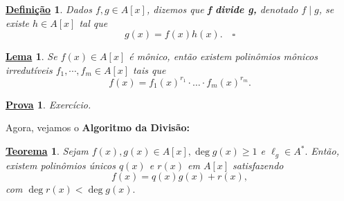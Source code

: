 \documentclass{article}
\newtheorem*{def*}{\underline{Defini\c c\~ao}}
\newtheorem*{theorem*}{\underline{Teorema}}
\newtheorem*{lemma*}{\underline{Lema}}
\newtheorem*{proof*}{\underline{Prova}}
\begin{document}
    \begin{def*}
      Dados \(f, g\in A[x]\), dizemos que \textbf{f divide g,} denotado \(f\mid g\), se existe \(h\in A[x]\) tal que 
      \[
        g(x) = f(x)h(x).\quad\square
      \]
    \end{def*}
    \begin{lemma*}
      Se \(f(x)\in A[x]\) é mônico, então existem polinômios mônicos irredutíveis \(f_{1}, \cdots, f_{m}\in A[x]\) tais que 
      \[
        f(x) = f_{1}(x)^{r_{1}}\cdot \dotsc \cdot f_{m}(x)^{r_{m}}.
      \]
    \end{lemma*}
    \begin{proof*}
      Exercício.
    \end{proof*}
    Agora, vejamos o \textbf{Algoritmo da Divisão:}
    \begin{theorem*}
      Sejam \(f(x), g(x)\in A[x], \deg{g(x)}\geq 1\) e \(\ell_{g}\in A^{*}.\) Então,
      existem polinômios únicos \(q(x)\) e \(r(x)\) em \(A[x]\) satisfazendo 
      \[
        f(x) = q(x)g(x) + r(x),
      \]
      com \(\deg{r(x)} < \deg{g(x)}.\)
    \end{theorem*}
\end{document}
